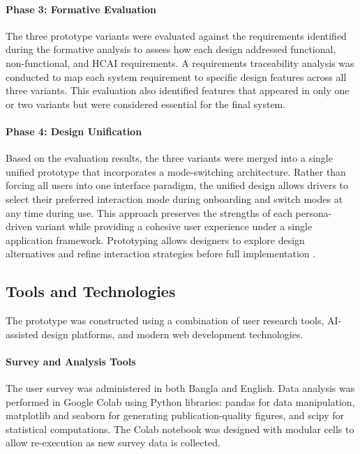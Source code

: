 \documentclass[sigconf]{acmart}
\begin{document}
\paragraph{Phase 3: Formative Evaluation}
The three prototype variants were evaluated against the requirements identified during the formative analysis to assess how each design addressed functional, non-functional, and HCAI requirements. A requirements traceability analysis was conducted to map each system requirement to specific design features across all three variants. This evaluation also identified features that appeared in only one or two variants but were considered essential for the final system.

\paragraph{Phase 4: Design Unification}
Based on the evaluation results, the three variants were merged into a single unified prototype that incorporates a mode-switching architecture. Rather than forcing all users into one interface paradigm, the unified design allows drivers to select their preferred interaction mode during onboarding and switch modes at any time during use. This approach preserves the strengths of each persona-driven variant while providing a cohesive user experience under a single application framework. Prototyping allows designers to explore design alternatives and refine interaction strategies before full implementation \cite{ref12, ref13}.

\subsection{Tools and Technologies}

The prototype was constructed using a combination of user research tools, AI-assisted design platforms, and modern web development technologies.

\paragraph{Survey and Analysis Tools}
The user survey was administered in both Bangla and English. Data analysis was performed in Google Colab using Python libraries: pandas for data manipulation, matplotlib and seaborn for generating publication-quality figures, and scipy for statistical computations. The Colab notebook was designed with modular cells to allow re-execution as new survey data is collected.
\end{document}
